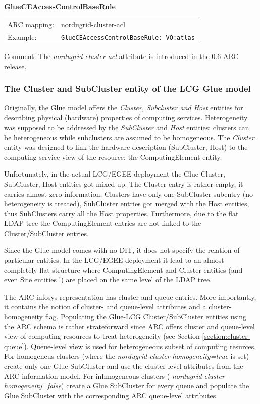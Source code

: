 \documentclass{article}
\begin{document}
\hspace*{0.5cm}
\begin{shaded}
 \textbf{GlueCEAccessControlBaseRule} 
\end{shaded}
\begin{tabular}{lp{10cm}}  
  ARC mapping:& nordugrid-cluster-acl\\
  Example:& \verb#GlueCEAccessControlBaseRule: VO:atlas#\\
\end{tabular}


Comment: The {\it nordugrid-cluster-acl} attribute is introduced
in the 0.6 ARC release.



\subsubsection{The Cluster and SubCluster entity of the LCG Glue model}

Originally, the Glue model offers the {\it Cluster, Subcluster and Host} 
entities for describing physical (hardware) properties of computing services.
Heterogeneity was supposed to be addressed by the {\it SubCluster} and
{\it Host} entities: clusters can be heterogeneous while 
subclusters are assumed to be homogeneous. The {\it Cluster} entity was 
designed to link the hardware description (SubCluster, Host) to the 
computing service view of the resource: the 
ComputingElement entity. 

Unfortunately, in the actual LCG/EGEE deployment the Glue Cluster, SubCluster, 
Host entities got mixed up. The Cluster entry is rather empty, 
it carries almost zero information. Clusters have only one SubCluster
subentry (no heterogeneity is treated), SubCluster entries got merged with the 
Host entities, thus SubClusters carry all the Host properties. 
Furthermore, due to the flat LDAP tree the ComputingElement entries
are not linked to the Cluster/SubCluster entries.

Since the Glue model comes with no DIT, it does not specify the relation of 
particular entities. In the LCG/EGEE deployment it lead to an almost completely
flat structure where ComputingElement and Cluster entities (and even Site entities !)
are placed on the same level of the LDAP tree. 

The ARC infosys representation has cluster and queue entries.
More importantly, it contains the notion of cluster- and queue-level attributes 
and a cluster-homogeneity flag. Populating the Glue-LCG Cluster/SubCluster 
entities using the ARC schema is rather strateforward since ARC offers cluster 
and queue-level view of computing resources to treat heterogeneity 
(see Section \ref{section:cluster-queue}).
Queue-level view is used for heterogeneous subset of computing resurces.
For homogeneus clusters (where the {\it nordugrid-cluster-homogeneity=true} 
is set) create only one Glue SubCluster and use the cluster-level attributes from
the ARC information model. For inhmogeneous clusters ( 
{\it nordugrid-cluster-homogeneity=false}) create a Glue SubCluster for every 
queue and populate the Glue SubCluster with the corresponding 
ARC queue-level attributes.
\end{document}
